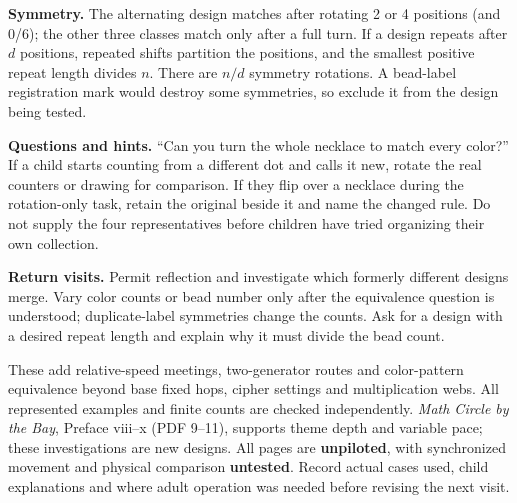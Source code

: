 \textbf{Symmetry.} The alternating design matches after rotating 2 or 4 positions (and 0/6); the other three classes match only after a full turn. If a design repeats after $d$ positions, repeated shifts partition the positions, and the smallest positive repeat length divides $n$. There are $n/d$ symmetry rotations. A bead-label registration mark would destroy some symmetries, so exclude it from the design being tested.

\textbf{Questions and hints.} ``Can you turn the whole necklace to match every color?'' If a child starts counting from a different dot and calls it new, rotate the real counters or drawing for comparison. If they flip over a necklace during the rotation-only task, retain the original beside it and name the changed rule. Do not supply the four representatives before children have tried organizing their own collection.

\textbf{Return visits.} Permit reflection and investigate which formerly different designs merge. Vary color counts or bead number only after the equivalence question is understood; duplicate-label symmetries change the counts. Ask for a design with a desired repeat length and explain why it must divide the bead count.

These add relative-speed meetings, two-generator routes and color-pattern equivalence beyond base fixed hops, cipher settings and multiplication webs. All represented examples and finite counts are checked independently. \emph{Math Circle by the Bay}, Preface viii--x (PDF 9--11), supports theme depth and variable pace; these investigations are new designs. All pages are \textbf{unpiloted}, with synchronized movement and physical comparison \textbf{untested}. Record actual cases used, child explanations and where adult operation was needed before revising the next visit.
